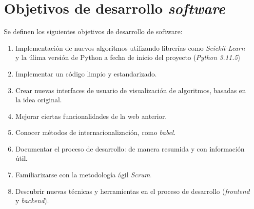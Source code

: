 \section{Objetivos de desarrollo \textit{software}}
Se definen los siguientes objetivos de desarrollo de software:

\begin{enumerate}
	\item Implementación de nuevos algoritmos utilizando librerías como \textit{Scickit-Learn} y la úlima versión de Python a fecha de inicio del proyecto (\textit{Python 3.11.5})
	\item Implementar un código limpio y estandarizado.
	\item Crear nuevas interfaces de usuario de visualización de algoritmos, basadas en la idea original.
	\item Mejorar ciertas funcionalidades de la web anterior.
	\item Conocer métodos de internacionalización, como \textit{babel}.
	\item Documentar el proceso de desarrollo: de manera resumida y con información útil.
	\item Familiarizarse con la metodología ágil \textit{Scrum}.
	\item Descubrir nuevas técnicas y herramientas en el proceso de desarrollo (\textit{frontend} y \textit{backend}).
\end{enumerate}

